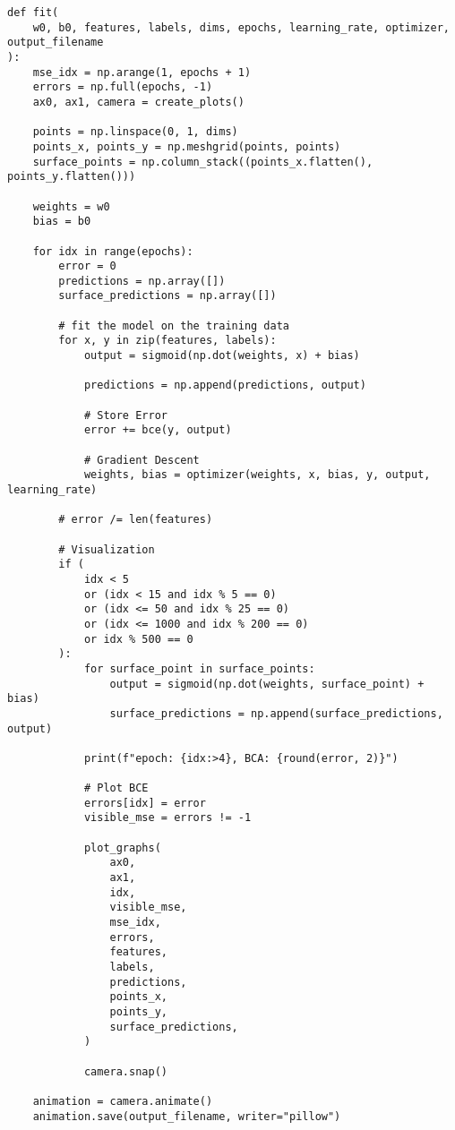 \documentclass[openany]{book}
\begin{document}
\begin{tcolorbox}
\tiny
\begin{verbatim}
def fit(
    w0, b0, features, labels, dims, epochs, learning_rate, optimizer, output_filename
):
    mse_idx = np.arange(1, epochs + 1)
    errors = np.full(epochs, -1)
    ax0, ax1, camera = create_plots()

    points = np.linspace(0, 1, dims)
    points_x, points_y = np.meshgrid(points, points)
    surface_points = np.column_stack((points_x.flatten(), points_y.flatten()))

    weights = w0
    bias = b0

    for idx in range(epochs):
        error = 0
        predictions = np.array([])
        surface_predictions = np.array([])

        # fit the model on the training data
        for x, y in zip(features, labels):
            output = sigmoid(np.dot(weights, x) + bias)

            predictions = np.append(predictions, output)

            # Store Error
            error += bce(y, output)

            # Gradient Descent
            weights, bias = optimizer(weights, x, bias, y, output, learning_rate)

        # error /= len(features)

        # Visualization
        if (
            idx < 5
            or (idx < 15 and idx % 5 == 0)
            or (idx <= 50 and idx % 25 == 0)
            or (idx <= 1000 and idx % 200 == 0)
            or idx % 500 == 0
        ):
            for surface_point in surface_points:
                output = sigmoid(np.dot(weights, surface_point) + bias)
                surface_predictions = np.append(surface_predictions, output)

            print(f"epoch: {idx:>4}, BCA: {round(error, 2)}")

            # Plot BCE
            errors[idx] = error
            visible_mse = errors != -1

            plot_graphs(
                ax0,
                ax1,
                idx,
                visible_mse,
                mse_idx,
                errors,
                features,
                labels,
                predictions,
                points_x,
                points_y,
                surface_predictions,
            )

            camera.snap()

    animation = camera.animate()
    animation.save(output_filename, writer="pillow")
\end{verbatim}
\end{tcolorbox}
\end{document}
